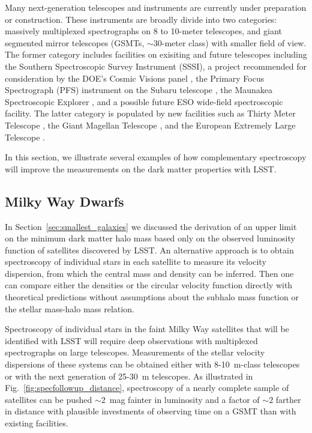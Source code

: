 Many next-generation telescopes and instruments are currently under preparation or construction. These instruments are broadly divide into two categories: massively multiplexed spectrographs on 8 to 10-meter telescopes, and giant segmented mirror telescopes (GSMTs, $\sim30$-meter class) with smaller field of view. The former category includes facilities on exisiting and future telescopes including the Southern Spectroscopic Survey Instrument (SSSI), a project recommended for consideration by the DOE’s Cosmic Visions panel \citep{1604.07626, 1604.07821}, the Primary Focus Spectrograph (PFS) instrument on the Subaru telescope \citep{2014PASJ...66R...1T}, the Maunakea Spectroscopic Explorer \citep[MSE;][]{MSEbook2018}, and a possible future ESO wide-field spectroscopic facility. 
The latter category is populated by new facilities such as Thirty Meter Telescope \citep[TMT;][]{1505.01195}, the Giant Magellan Telescope \citep[GMT;][]{GMT:2018}, and the European Extremely Large Telescope \citep[E-ELT;][]{EELT:2010}. 

In this section, we illustrate several examples of how complementary spectroscopy will improve the measurements on the dark matter properties with LSST.

\subsection{Milky Way Dwarfs }
In Section~\ref{sec:smallest_galaxies} we discussed the derivation of an upper limit on the minimum dark matter halo mass based only on the observed luminosity function of satellites discovered by LSST.   An alternative approach is to obtain spectroscopy of individual stars in each satellite to measure its velocity dispersion, from which the central mass and density can be inferred.  Then one can compare either the densities or the circular velocity function directly with theoretical predictions without assumptions about the subhalo mass function or the stellar mass-halo mass relation.

Spectroscopy of individual stars in the faint Milky Way satellites that will be identified with LSST will require deep observations with multiplexed spectrographs on large telescopes.  Measurements of the stellar velocity dispersions of these systems can be obtained either with 8-10~m-class telescopes or with the next generation of 25-30~m telescopes.  As illustrated in Fig.~\ref{fig:specfollowup_distance}, spectroscopy of a nearly complete sample of satellites can be pushed $\sim2$~mag fainter in luminosity and a factor of $\sim2$ farther in distance with plausible investments of observing time on a GSMT than with existing facilities.

